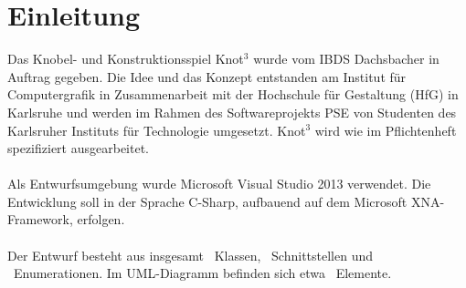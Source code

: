 \chapter{Einleitung}


Das Knobel- und Konstruktionsspiel Knot$^3$ wurde vom IBDS Dachsbacher in Auftrag gegeben. Die Idee und das Konzept entstanden am Institut für Computergrafik in Zusammenarbeit mit der Hochschule für Gestaltung (HfG) in Karlsruhe und werden im Rahmen des Softwareprojekts PSE von Studenten des Karlsruher Instituts für Technologie umgesetzt. Knot$^3$ wird wie im Pflichtenheft spezifiziert ausgearbeitet.
\\\\
Als Entwurfsumgebung wurde Microsoft Visual Studio 2013 verwendet. Die Entwicklung soll in der Sprache C-Sharp, aufbauend auf dem Microsoft XNA-Framework, erfolgen.
\\\\
Der Entwurf besteht aus insgesamt \CountClasses~Klassen, \CountInterfaces~Schnittstellen und \CountEnums~Enumerationen. Im UML-Diagramm befinden sich etwa \CountAll~Elemente.